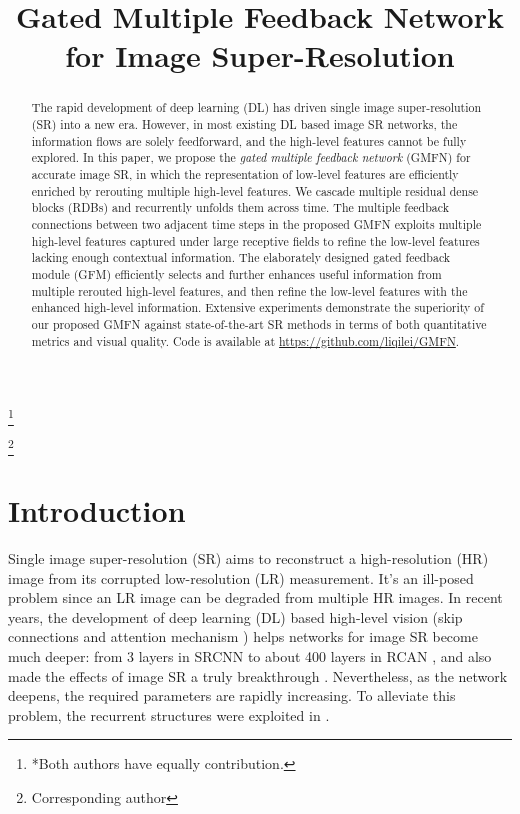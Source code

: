 \documentclass{bmvc2k}
\title{Gated Multiple Feedback Network for Image Super-Resolution}
\newcommand\blfootnote[1]{\begingroup
	\renewcommand\thefootnote{}\footnote{#1}\addtocounter{footnote}{-1}\endgroup
}
\begin{document}
	
	\maketitle
	
\blfootnote{*Both authors have equally contribution.}
\blfootnote{Corresponding author}	
		\vspace{-\topsep}
	\begin{abstract}
		The rapid development of deep learning (DL) has driven single image super-resolution (SR) into a new era. However, in most existing DL based image SR networks, the information flows are solely feedforward, and the high-level features cannot be fully explored. In this paper, we propose the \textit{gated multiple feedback network} (GMFN) for accurate image SR, in which the representation of low-level features are efficiently enriched by rerouting multiple high-level features. We cascade multiple residual dense blocks (RDBs) and recurrently unfolds them across time. The multiple feedback connections between two adjacent time steps in the proposed GMFN exploits multiple high-level features captured under large receptive fields to refine the low-level features lacking enough contextual information. The elaborately designed gated feedback module (GFM) efficiently selects and further enhances useful information from multiple rerouted high-level features, and then refine the low-level features with the enhanced high-level information. Extensive experiments demonstrate the superiority of our proposed GMFN against state-of-the-art SR methods in terms of both quantitative metrics and visual quality. Code is available at \url{https://github.com/liqilei/GMFN}.
	\end{abstract}
	
	
	\section{Introduction}
	\label{sec:intro}
	\setlength{\parskip}{0.5\baselineskip}
	Single image super-resolution (SR) aims to reconstruct a high-resolution (HR) image from its corrupted low-resolution (LR) measurement. It's an ill-posed problem since an LR image can be degraded from multiple HR images. In recent years, the development of deep learning (DL) based high-level vision (skip connections \cite{he2016deep, huang2017densely} and attention mechanism \cite{hu2018squeeze}) helps networks for image SR become much deeper: from 3 layers in SRCNN \cite{dong2014learning} to about 400 layers in RCAN \cite{zhang2018image}, and also made the effects of image SR a truly breakthrough \cite{kim2016accurate, dong2016accelerating, lim2017enhanced, tong2017image, haris2018deep, zhang2018residual}. Nevertheless, as the network deepens, the required parameters are rapidly increasing. To alleviate this problem, the recurrent structures were exploited in \cite{kim2016deeply, tai2017image, han2018image,li2019srfbn}.
	
\end{document}
